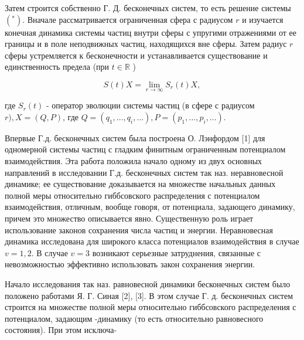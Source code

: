 \documentclass[10pt]{article}
\begin{document}
Затем строится собственно Г. Д. бесконечных систем, то есть решение системы $\left({ }^{*}\right)$. Вначале рассматривается ограниченная сфера с радиусом $r$ и изучается конечная динамика системы частиц внутри сферы с упругими отражениями от ее границы и в поле неподвижных частиц, находящихся вне сферы. Затем радиус $r$ сферы устремляется к бесконечности и устанавливается существование и единственность предела (при $t \in \mathbb{R}$ )



\[

S(t) X=\lim _{r \rightarrow \infty} S_{r}(t) X,

\]



где $S_{r}(t)$ - оператор эволюции системы частиц (в сфере с радиусом $r), X=(Q, P)$, где $Q=\left(q_{1}, \ldots, q_{i}, \ldots\right), P=\left(p_{1}, \ldots, p_{i}, \ldots\right)$.



Впервые Г.д. бесконечных систем была построена О. Лэнфордом [1] для одномерной системы частиц с гладким финитным ограниченным потенциалом взаимодействия. Эта работа положила начало одному из двух основных направлений в исследовании Г.д. бесконечных систем так наз. неравновесной динамике; ее существование доказывается на множестве начальных данных полной меры относительно гиббсовского распределения с потенциалом взаимодействия, отличным, вообще говоря, от потенциала, задающего динамику, причем это множество описывается явно. Существенную роль играет использование законов сохранения числа частиц и энергии. Неравновесная динамика исследована для широкого класса потенциалов взаимодействия в случае $v=1,2$. В случае $v=3$ возникают серьезные затруднения, связанные с невозможностью эффективно использовать закон сохранения энергии.



Начало исследования так наз. равновесной динамики бесконечных систем было положено работами Я. Г. Синая [2], [3]. В этом случае Г. д. бесконечных систем строится на множестве полной меры относительно гиббсовского распределения с потенциалом, задающим -динамику (то есть относительно равновесного состояния). При этом исключа-
\end{document}
